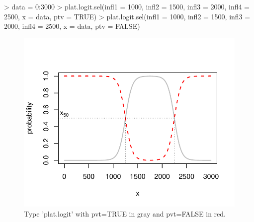 \documentclass[letterpaper, 12pt]{article}
\begin{document}
\newpage
\begin{Schunk}
\begin{Sinput}
> data = 0:3000
> plat.logit.sel(infl1 = 1000, infl2 = 1500, infl3 = 2000, infl4 = 2500, x = data, ptv = TRUE)
> plat.logit.sel(infl1 = 1000, infl2 = 1500, infl3 = 2000, infl4 = 2500, x = data, ptv = FALSE)
\end{Sinput}
\end{Schunk}
\begin{figure}[h]
\begin{center}
\includegraphics{relation_sel-012}
\end{center}
\caption{Type 'plat.logit' with pvt=TRUE in gray and pvt=FALSE in red.}
\label{fig6}
\end{figure}

        
        
        
        
        
\end{document}
